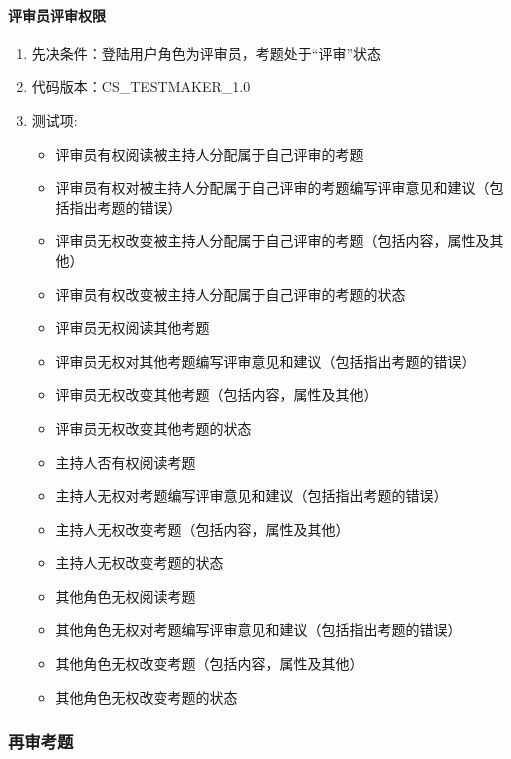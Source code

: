 \documentclass[hyperref, a4paper]{ctexart}
\providecommand{\tightlist}{%
  \setlength{\itemsep}{0pt}\setlength{\parskip}{0pt}}
\let\oldparagraph\paragraph
\renewcommand{\paragraph}[1]{\oldparagraph{#1}\mbox{}}
\begin{document}
\hypertarget{ux8bc4ux5ba1ux5458ux8bc4ux5ba1ux6743ux9650}{%
\paragraph{评审员评审权限}\label{ux8bc4ux5ba1ux5458ux8bc4ux5ba1ux6743ux9650}}

\begin{enumerate}
\def\labelenumi{\arabic{enumi}.}
\tightlist
\item
  先决条件：登陆用户角色为评审员，考题处于``评审''状态
\item
  代码版本：CS\_TESTMAKER\_1.0
\item
  测试项:

  \begin{itemize}
  \tightlist
  \item
    评审员有权阅读被主持人分配属于自己评审的考题
  \item
    评审员有权对被主持人分配属于自己评审的考题编写评审意见和建议（包括指出考题的错误）
  \item
    评审员无权改变被主持人分配属于自己评审的考题（包括内容，属性及其他）
  \item
    评审员有权改变被主持人分配属于自己评审的考题的状态
  \item
    评审员无权阅读其他考题
  \item
    评审员无权对其他考题编写评审意见和建议（包括指出考题的错误）
  \item
    评审员无权改变其他考题（包括内容，属性及其他）
  \item
    评审员无权改变其他考题的状态
  \item
    主持人否有权阅读考题
  \item
    主持人无权对考题编写评审意见和建议（包括指出考题的错误）
  \item
    主持人无权改变考题（包括内容，属性及其他）
  \item
    主持人无权改变考题的状态
  \item
    其他角色无权阅读考题
  \item
    其他角色无权对考题编写评审意见和建议（包括指出考题的错误）
  \item
    其他角色无权改变考题（包括内容，属性及其他）
  \item
    其他角色无权改变考题的状态
  \end{itemize}
\end{enumerate}

\hypertarget{ux518dux5ba1ux8003ux9898}{%
\subsubsection{再审考题}\label{ux518dux5ba1ux8003ux9898}}
\end{document}
